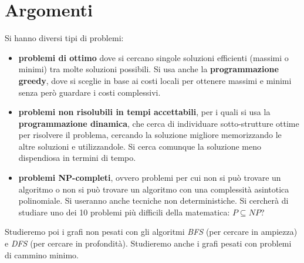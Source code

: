 \documentclass[a4paper,12pt, oneside]{book}
\begin{document}
\section{Argomenti}
Si hanno diversi tipi di problemi:
\begin{itemize}
  \item \textbf{problemi di ottimo} dove si cercano singole soluzioni
  efficienti (massimi o minimi) tra molte soluzioni possibili. Si
  usa anche la \textbf{programmazione greedy}, dove si sceglie in base
  ai costi locali per ottenere massimi e minimi senza però guardare i
  costi complessivi.   
  \item \textbf{problemi non risolubili in tempi accettabili}, per i
  quali si usa la \textbf{programmazione dinamica}, che cerca di
  individuare sotto-strutture ottime per risolvere il problema,
  cercando la soluzione migliore memorizzando le altre soluzioni e
  utilizzandole. Si cerca comunque la soluzione meno dispendiosa in
  termini di tempo.
  \item \textbf{problemi NP-completi}, ovvero problemi per cui non si
  può trovare un algoritmo o non si può trovare un algoritmo con una
  complessità asintotica polinomiale. Si useranno anche tecniche non
  deterministiche. Si cercherà di studiare uno dei 10 problemi più
  difficili della matematica: $P\subseteq NP$?
\end{itemize}
Studieremo poi i grafi non pesati con gli algoritmi \textit{BFS}
(per cercare in ampiezza) e \textit{DFS} (per cercare in
profondità). Studieremo anche i grafi pesati con problemi di cammino
minimo.\\
\end{document}

